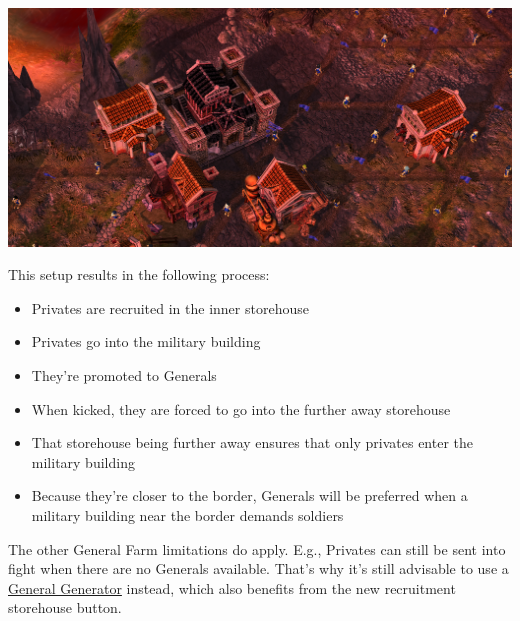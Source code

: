 \documentclass[12pt]{article}
\begin{document}
\vspace{0.4cm}
\includegraphics[width=\textwidth]{improved_general_farm}
\vspace{0.1cm}

This setup results in the following process:

\begin{itemize}
  \item Privates are recruited in the inner storehouse
  \item Privates go into the military building
  \item They're promoted to Generals
  \item When kicked, they are forced to go into the further away storehouse
  \item That storehouse being further away ensures that only privates enter the military building
  \item Because they're closer to the border, Generals will be preferred when a military building near the border demands soldiers
\end{itemize}

The other General Farm limitations do apply. E.g., Privates can still be sent into fight when there are no Generals available. That's why it's still advisable to use a \hyperref[sec:generalgenerator]{General Generator} instead, which also benefits from the new recruitment storehouse button.
\end{document}
